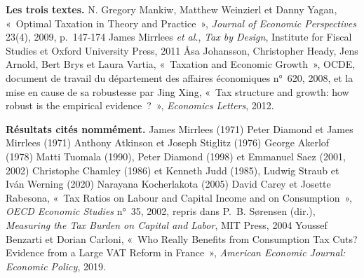 \documentclass[11pt,a4paper]{article}
\begin{document}
{\small
\textbf{Les trois textes.} N. Gregory Mankiw, Matthew Weinzierl et Danny Yagan, «~Optimal Taxation
in Theory and Practice~», \emph{Journal of Economic Perspectives} 23(4), 2009, p.~147-174
\textbullet{} James Mirrlees \emph{et al.}, \emph{Tax by Design}, Institute for Fiscal Studies et
Oxford University Press, 2011 \textbullet{} Åsa Johansson, Christopher Heady, Jens Arnold, Bert Brys
et Laura Vartia, «~Taxation and Economic Growth~», OCDE, document de travail du département des
affaires économiques n°~620, 2008, et la mise en cause de sa robustesse par Jing Xing, «~Tax
structure and growth: how robust is the empirical evidence~?~», \emph{Economics Letters}, 2012.

\textbf{Résultats cités nommément.} James Mirrlees (1971) \textbullet{} Peter Diamond et James
Mirrlees (1971) \textbullet{} Anthony Atkinson et Joseph Stiglitz (1976) \textbullet{} George Akerlof
(1978) \textbullet{} Matti Tuomala (1990), Peter Diamond (1998) et Emmanuel Saez (2001, 2002)
\textbullet{} Christophe Chamley (1986) et Kenneth Judd (1985), Ludwig Straub et Iván Werning (2020)
\textbullet{} Narayana Kocherlakota (2005) \textbullet{} David Carey et Josette Rabesona, «~Tax
Ratios on Labour and Capital Income and on Consumption~», \emph{OECD Economic Studies} n°~35, 2002,
repris dans P.~B. Sørensen (dir.), \emph{Measuring the Tax Burden on Capital and Labor}, MIT Press,
2004 \textbullet{} Youssef Benzarti et Dorian Carloni, «~Who Really Benefits from Consumption Tax
Cuts? Evidence from a Large VAT Reform in France~», \emph{American Economic Journal: Economic
Policy}, 2019.

}
\end{document}
